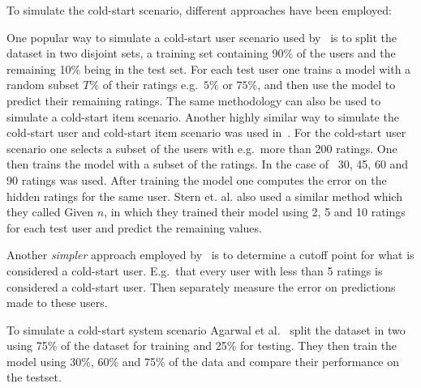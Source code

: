 To simulate the cold-start scenario, different approaches have been employed:

One popular way to simulate a cold-start user scenario used by~\cite{Stern2009,
Lam2008} is to split the dataset in two disjoint sets, a training set
containing 90\% of the users and the remaining 10\% being in the test set. For
each test user one trains a model with a random subset $T\%$ of their ratings
e.g.\ $5\%$ or $75\%$, and then use the model to predict their remaining
ratings. The same methodology can also be used to simulate a cold-start item
scenario. Another highly similar way to simulate the cold-start user and
cold-start item scenario was used in~\cite{Rashid2002, Rashid2008}. For the
cold-start user scenario one selects a subset of the users with e.g.\ more than
200 ratings. One then trains the model with a subset of the ratings. In the
case of~\cite{Rashid2002} 30, 45, 60 and 90 ratings was used. After training
the model one computes the error on the hidden ratings for the same user.
Stern et. al. \cite{Stern1998} also used a similar method which they called Given $n$, in which
they trained their model using 2, 5 and 10 ratings for each test user and predict
the remaining values.

Another \emph{simpler} approach employed by~\cite{Massa2007, Jamali2009} is to
determine a cutoff point for what is considered a cold-start user. E.g.\ that
every user with less than 5 ratings is considered a cold-start user. Then
separately measure the error on predictions made to these users.

To simulate a cold-start system scenario Agarwal et al.~\cite{Agarwal2009}
split the dataset in two using 75\% of the dataset for training and 25\% for
testing. They then train the model using 30\%, 60\% and 75\% of the data and
compare their performance on the testset.





